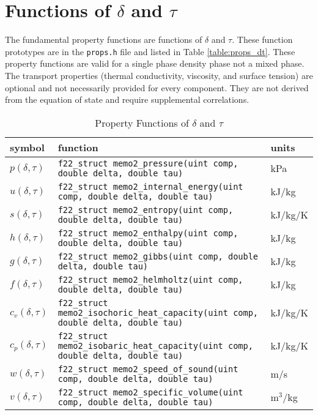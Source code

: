 \documentclass[oneside]{book}
\begin{document}
\section{Functions of $\delta$ and $\tau$}

The fundamental property functions are functions of $\delta$ and $\tau$.  These function prototypes are in the \texttt{props.h} file and listed in Table \ref{table:props_dt}.  These property functions are valid for a single phase density phase not a mixed phase. The transport properties (thermal conductivity, viscosity, and surface tension) are optional and not necessarily provided for every component.  They are not derived from the equation of state and require supplemental correlations.  

\begin{table}[h!]
\centering
\caption{Property Functions of $\delta$ and $\tau$}
\begin{tabular}{ l l l }
\hline
symbol & function & units \\
\hline
\hline
$p(\delta, \tau)$ & \texttt{f22\_struct memo2\_pressure(uint comp, double delta, double tau)} & kPa \\ [1ex]
$u(\delta, \tau)$ & \texttt{f22\_struct memo2\_internal\_energy(uint comp, double delta, double tau)} &  kJ/kg \\ [1ex]
$s(\delta, \tau)$ & \texttt{f22\_struct memo2\_entropy(uint comp, double delta, double tau)} &  kJ/kg/K \\ [1ex]
$h(\delta, \tau)$ & \texttt{f22\_struct memo2\_enthalpy(uint comp, double delta, double tau)} &  kJ/kg \\ [1ex]
$g(\delta, \tau)$ & \texttt{f22\_struct memo2\_gibbs(uint comp, double delta, double tau)} &  kJ/kg \\ [1ex]
$f(\delta, \tau)$ & \texttt{f22\_struct memo2\_helmholtz(uint comp, double delta, double tau)} &  kJ/kg \\ [1ex]
$c_v(\delta, \tau)$ & \texttt{f22\_struct memo2\_isochoric\_heat\_capacity(uint comp, double delta, double tau)} &  kJ/kg/K \\ [1ex]
$c_p(\delta, \tau)$ & \texttt{f22\_struct memo2\_isobaric\_heat\_capacity(uint comp, double delta, double tau)} &  kJ/kg/K \\ [1ex]
$w(\delta, \tau)$ & \texttt{f22\_struct memo2\_speed\_of\_sound(uint comp, double delta, double tau)} &  m/s \\ [1ex]
$v(\delta, \tau)$ & \texttt{f22\_struct memo2\_specific\_volume(uint comp, double delta, double tau)} &  m$^3$/kg \\ [1ex]

\end{tabular}
\end{table}
\end{document}
